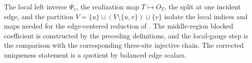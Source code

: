\begin{remark}
    The local left inverse $\Psi_v$, the realization map $T \mapsto O_T$,
    the split at one incident edge, and the partition
    $V = \{u\} \sqcup (V \setminus \{u,v\}) \sqcup \{v\}$ isolate the local
    indices and maps needed for the edge-centered reduction of
    \cite[Section~3]{Molnar2018NormalPEPS}. The middle-region blocked coefficient is
    constructed by the preceding definitions, and the local-gauge step is the
    comparison with the corresponding three-site injective chain. The corrected
    uniqueness statement is a quotient by balanced edge scalars.
\end{remark}
